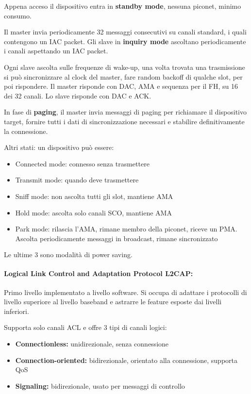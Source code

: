 Appena acceso il dispositivo entra in \textbf{standby mode}, nessuna piconet, minimo consumo.

Il master invia periodicamente 32 messaggi consecutivi su canali standard, i quali contengono un IAC packet. Gli slave in \textbf{inquiry mode} ascoltano periodicamente i canali aspettando un IAC packet.

Ogni slave ascolta sulle frequenze di wake-up, una volta trovata una trasmissione si può sincronizzare al clock del master, fare random backoff di qualche slot, per poi rispondere. Il master risponde con DAC, AMA e sequenza per il FH, su 16 dei 32 canali. Lo slave risponde con DAC e ACK. 

In fase di \textbf{paging}, il master invia messaggi di paging per richiamare il dispositivo target, fornire tutti i dati di sincronizzazione necessari e stabilire definitivamente la connessione.

Altri stati: un dispositivo può essere: 
\begin{itemize}
    \item Connected mode: connesso senza trasmettere
    
    \item Transmit mode: quando deve trasmettere
    
    \item Sniff mode: non ascolta tutti gli slot, mantiene AMA
    
    \item Hold mode: ascolta solo canali SCO, mantiene AMA
    
    \item Park mode: rilascia l'AMA, rimane membro della piconet, riceve un PMA. Ascolta periodicamente messaggi in broadcast, rimane sincronizzato
\end{itemize}
Le ultime 3 sono modalità di power saving. 

\paragraph{Logical Link Control and Adaptation Protocol L2CAP:} Primo livello implementato a livello software. Si occupa di adattare i protocolli di livello superiore al livello baseband e astrarre le feature esposte dai livelli inferiori.

Supporta solo canali ACL e offre 3 tipi di canali logici: 
\begin{itemize}
    \item \textbf{Connectionless:} unidirezionale, senza connessione
    
    \item \textbf{Connection-oriented:} bidirezionale, orientato alla connessione, supporta QoS
    
    \item \textbf{Signaling:} bidirezionale, usato per messaggi di controllo
\end{itemize}

